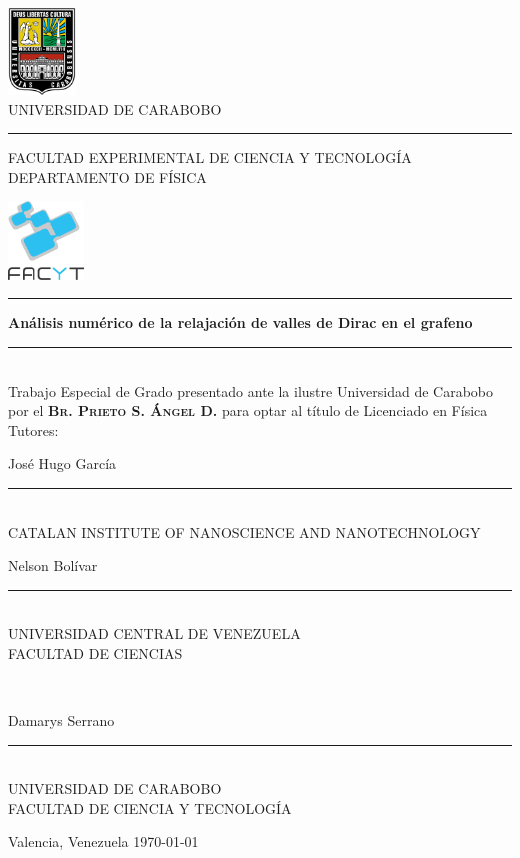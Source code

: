 \begin{titlepage}
	\centering
	\includegraphics[height=2.3cm]{./img/logo-uc}\\[0.5ex]
	{\FuturaRenner UNIVERSIDAD DE CARABOBO}\\[.5ex]
	\rule{8cm}{0.1pt}
	\begin{flushright}
		\noindent\FuturaRenner
		\parbox[b][2.08cm][t]{\dimexpr\linewidth-2.11825cm\relax}{%
			\flushleft FACULTAD EXPERIMENTAL DE CIENCIA Y TECNOLOGÍA\\\vfil
			DEPARTAMENTO DE FÍSICA}
		\includegraphics[width=2cm]{./img/facyt}
	\end{flushright}
	\vspace*{3ex}
	\rule{\textwidth}{1pt}\par
	\vspace{0.5\baselineskip}
	{\huge\bfseries Análisis numérico de la relajación de valles de Dirac en el
		grafeno\par}\vspace{0.5\baselineskip}
	\rule{\textwidth}{1pt}\\[3ex]
	{\Large Trabajo Especial de Grado presentado ante la ilustre Universidad de
		Carabobo por el \textsc{\bfseries Br. Prieto S. Ángel D.} para optar al
		título de Licenciado en Física}\\[3ex]
	{\large Tutores:}\\[3ex]
	\begin{minipage}{0.49\linewidth}
		\centering\noindent
		{\large José Hugo García}
		\rule{0.85\linewidth}{1pt}\\
		{\FuturaRenner \uppercase{Catalan Institute of Nanoscience and Nanotechnology}}
	\end{minipage}\hfill
	\begin{minipage}{0.49\linewidth}
		\centering\noindent
		{\large Nelson Bolívar}
		\rule{0.85\linewidth}{1pt}\\
		{\FuturaRenner UNIVERSIDAD CENTRAL DE VENEZUELA\\FACULTAD DE CIENCIAS}
	\end{minipage}\\[3ex]
	\begin{minipage}{0.49\linewidth}
		\centering\noindent
		{\large Damarys Serrano}
		\rule{0.85\linewidth}{1pt}\\
		{\FuturaRenner UNIVERSIDAD DE CARABOBO\\FACULTAD DE CIENCIA Y TECNOLOGÍA}
	\end{minipage}
	\vfill
	{\large Valencia, Venezuela}
	\hfill
	{\large \today}
\end{titlepage}

\tableofcontents
\listoffigures